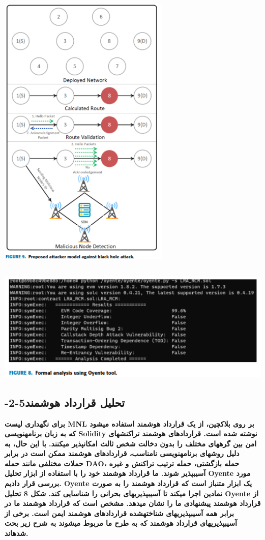 \documentclass{article} %
\begin{document}
\noindent 
\subsection{\includegraphics*[width=3.22in, height=5.21in]{image19}\includegraphics*[width=6.71in, height=2.66in]{image20} -2-5تحلیل قرارداد هوشمند}

\noindent 
{\bf برای نگهداری لیست MNL بر روی بلاکچین، از یک قرارداد هوشمند استفاده میشود که به زبان برنامهنویسی Solidity نوشته شده است. قراردادهای هوشمند تراکنشهای امن بین گرههای مختلف را بدون دخالت شخص ثالث امکانپذیر میکنند. با این حال، به دلیل روشهای برنامهنویسی نامناسب، قراردادهای هوشمند ممکن است در برابر حملات مختلفی مانند حمله DAO، حمله بازگشتی، حمله ترتیب تراکنش و غیره آسیبپذیر شوند. ما قرارداد هوشمند خود را با استفاده از ابزار تحلیل Oyente مورد بررسی قرار دادیم. Oyente یک ابزار متنباز است که قرارداد هوشمند را به صورت نمادین اجرا میکند تا آسیبپذیریهای بحرانی را شناسایی کند. شکل 8 تحلیل Oyente از قرارداد هوشمند پیشنهادی ما را نشان میدهد. مشخص است که قرارداد هوشمند ما در برابر همه آسیبپذیریهای شناختهشده قراردادهای هوشمند ایمن است. برخی از آسیبپذیریهای قرارداد هوشمند که به طرح ما مربوط میشوند به شرح زیر بحث شدهاند.}
\end{document}
